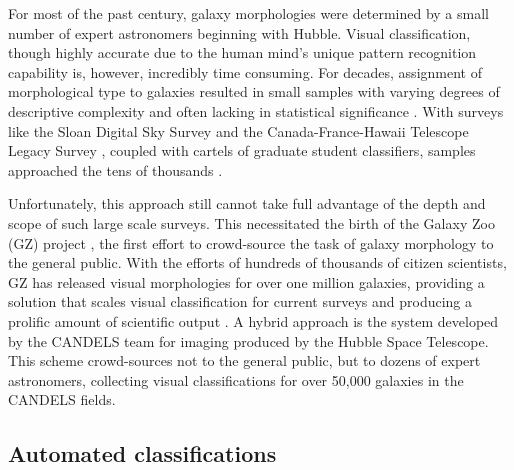 For most of the past century, galaxy morphologies were determined by a small number of expert astronomers beginning with Hubble. Visual classification, though highly accurate due to the human mind's unique pattern recognition capability is, however, incredibly time consuming. For decades, assignment of morphological type to galaxies resulted in small samples with varying degrees of descriptive complexity and often lacking in statistical significance \citep{Hubble1936, Sandage1961, SandageTammann1981, deVaucouleurs1963, deVaucouleurs1991}. With surveys like the Sloan Digital Sky Survey \citep[SDSS,][]{Abazajian2003} and the Canada-France-Hawaii Telescope Legacy Survey \citep{Gwyn2012}, coupled with cartels of graduate student classifiers, samples approached the tens of thousands \citep{Fukugita2007, Schawinski2007, NairAbraham2010}.

Unfortunately, this approach still cannot take full advantage of the depth and scope of such large scale surveys. This necessitated the birth of the Galaxy Zoo (GZ) project \citep{Lintott2008, Lintott2011, Willett2013, Willett2017, Simmons2017}, the first effort to crowd-source the task of galaxy morphology to the general public. With the efforts of hundreds of thousands of citizen scientists, GZ has released visual morphologies for over one million galaxies, providing a solution that scales visual classification for current surveys and producing a prolific amount of scientific output \citep[e.g.,][]{Land2008, Bamford2009, Darg2010, Schawinski2014, Galloway2015, Smethurst2016}.
A hybrid approach is the system developed by the CANDELS \citep{Grogin2011, Koekemoer2011} team for imaging produced by the Hubble Space Telescope. This scheme \citep{Kartaltepe2015} crowd-sources not to the general public, but to dozens of expert astronomers, collecting visual classifications for over 50,000 galaxies in the CANDELS fields. 


\subsection{Automated classifications}
\label{chap1: automated}


